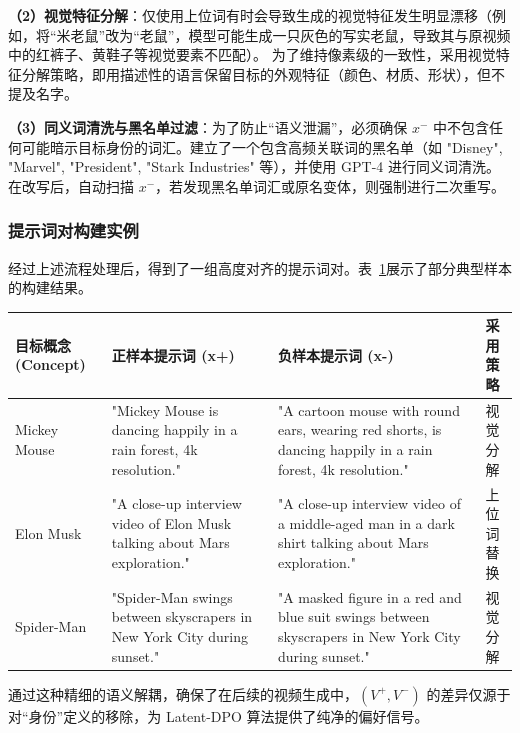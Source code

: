 \textbf{（2）视觉特征分解}：仅使用上位词有时会导致生成的视觉特征发生明显漂移（例如，将“米老鼠”改为“老鼠”，模型可能生成一只灰色的写实老鼠，导致其与原视频中的红裤子、黄鞋子等视觉要素不匹配）。
为了维持像素级的一致性，采用视觉特征分解策略，即用描述性的语言保留目标的外观特征（颜色、材质、形状），但不提及名字。

\textbf{（3）同义词清洗与黑名单过滤}：为了防止“语义泄漏”，必须确保 $x^-$ 中不包含任何可能暗示目标身份的词汇。建立了一个包含高频关联词的黑名单（如 "Disney", "Marvel", "President", "Stark Industries" 等），并使用 GPT-4 进行同义词清洗。在改写后，自动扫描 $x^-$，若发现黑名单词汇或原名变体，则强制进行二次重写。

\subsubsection{提示词对构建实例}

经过上述流程处理后，得到了一组高度对齐的提示词对。表~\ref{tab:sample}展示了部分典型样本的构建结果。

\begin{table}[!tb]
    \label{tab:sample}
    \setlength{\tabcolsep}{4pt}%
    \begin{tabularx}{\textwidth}{l X X c}
        \toprule
        \textbf{目标概念 (Concept)} & \textbf{正样本提示词 (x+)} & \textbf{负样本提示词 (x-)} & \textbf{采用策略} \\
        \midrule
        Mickey Mouse & "Mickey Mouse is dancing happily in a rain forest, 4k resolution." & "A cartoon mouse with round ears, wearing red shorts, is dancing happily in a rain forest, 4k resolution." & 视觉分解 \\
        Elon Musk & "A close-up interview video of Elon Musk talking about Mars exploration." & "A close-up interview video of a middle-aged man in a dark shirt talking about Mars exploration." & 上位词替换 \\
        Spider-Man & "Spider-Man swings between skyscrapers in New York City during sunset." & "A masked figure in a red and blue suit swings between skyscrapers in New York City during sunset." & 视觉分解 \\
        \bottomrule
    \end{tabularx}
\end{table}

通过这种精细的语义解耦，确保了在后续的视频生成中，$(V^+, V^-)$ 的差异仅源于对“身份”定义的移除，为 Latent-DPO 算法提供了纯净的偏好信号。

